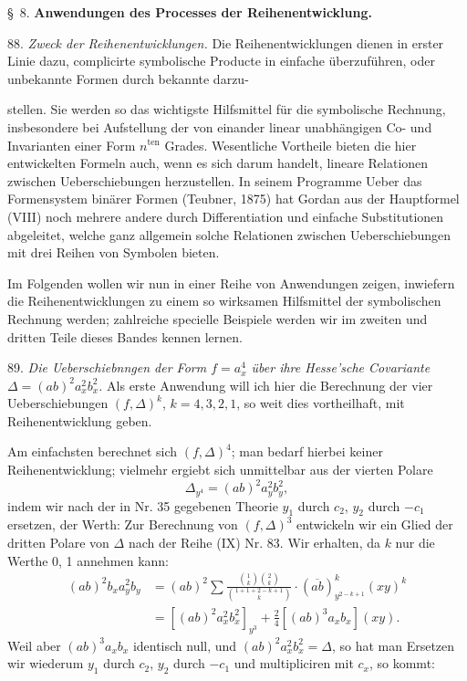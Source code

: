 \S~8. \textbf{Anwendungen des Processes der Reihenentwicklung.}

88. \textit{Zweck der Reihenentwicklungen.} Die Reihenentwicklungen dienen in erster Linie dazu, complicirte symbolische Producte in einfache \"uberzuf\"uhren, oder unbekannte Formen durch bekannte darzu-


stellen. Sie werden so das wichtigste Hilfsmittel f\"ur die symbolische Rechnung, insbesondere bei Aufstellung der von einander linear unabh\"angigen Co- und Invarianten einer Form $n^{\mathrm{ten}}$ Grades. Wesentliche Vortheile bieten die hier entwickelten Formeln auch, wenn es sich darum handelt, lineare Relationen zwischen Ueberschiebungen herzustellen. In seinem Programme \glqq Ueber das Formensystem bin\"arer Formen\grqq{} (Teubner, 1875) hat Gordan aus der Hauptformel (VIII) noch mehrere andere durch Differentiation und einfache Substitutionen abgeleitet, welche ganz allgemein solche Relationen zwischen Ueberschiebungen mit drei Reihen von Symbolen bieten.

Im Folgenden wollen wir nun in einer Reihe von Anwendungen zeigen, inwiefern die Reihenentwicklungen zu einem so wirksamen Hilfsmittel der symbolischen Rechnung werden; zahlreiche specielle Beispiele werden wir im zweiten und dritten Teile dieses Bandes kennen lernen.

89. \textit{Die Ueberschiebnngen der Form $f = a_x^4$ \"uber ihre Hesse'sche Covariante $\Delta = (ab)^2 a_x^2 b_x^2$.} %
Als erste Anwendung will ich hier die Berechnung der vier Ueberschiebungen $(f,\Delta)^k$, $k=4,3,2,1$, so weit dies vortheilhaft, mit Reihenentwicklung geben.

Am einfachsten berechnet sich $(f,\Delta)^4$; man bedarf hierbei keiner Reihenentwicklung; vielmehr ergiebt sich unmittelbar aus der vierten Polare
\[
\Delta_{y^4} = (ab)^2 a_y^2 b_y^2,
\]
indem wir nach der in Nr. 35 gegebenen Theorie $y_1$ durch $c_2$, $y_2$ durch $-c_1$ ersetzen, der Werth:
Zur Berechnung von $(f,\Delta)^3$ entwickeln wir ein Glied der dritten Polare von $\Delta$ nach der Reihe (IX) Nr. 83. Wir erhalten, da $k$ nur die Werthe 0, 1 annehmen kann:
\[
\begin{aligned}
(ab)^2 b_x a_y^2 b_y &= (ab)^2 \sum \frac{\binom{1}{k}\binom{2}{k}}{\binom{1+1+2-k+1}{k}} \cdot (\overline{ab})^{k}_{y^{2-k+1}} (xy)^k \\
&= \left[(ab)^2 a_x^2 b_x^2\right]_{y^3} + \frac{2}{4}\left[(ab)^3 a_x b_x\right](xy). %
\end{aligned}
\]
Weil aber $(ab)^3 a_x b_x$ identisch null, und $(ab)^2 a_x^2 b_x^2 = \Delta$, so hat man
Ersetzen wir wiederum $y_1$ durch $c_2$, $y_2$ durch $-c_1$ und multipliciren mit $c_x$, so kommt:


